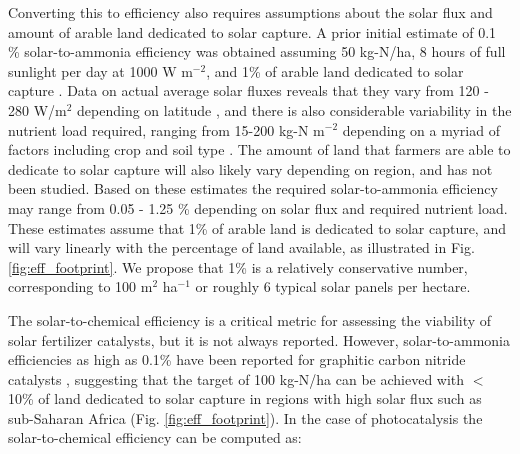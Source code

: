 Converting this to efficiency also requires assumptions about the solar flux and amount of arable land dedicated to solar capture. A prior initial estimate of 0.1 \% solar-to-ammonia efficiency was obtained assuming 50 kg-N/ha, 8 hours of full sunlight per day at 1000 W m$^{-2}$, and 1\% of arable land dedicated to solar capture \cite{Medford_2017}. Data on actual average solar fluxes reveals that they vary from 120 - 280 W/m$^2$ depending on latitude \cite{MacKay_2013}, and there is also considerable variability in the nutrient load required, ranging from 15-200 kg-N m$^{-2}$ depending on a myriad of factors including crop and soil type \cite{FAOSTAT}. The amount of land that farmers are able to dedicate to solar capture will also likely vary depending on region, and has not been studied. Based on these estimates the required solar-to-ammonia efficiency may range from 0.05 - 1.25 \% depending on solar flux and required nutrient load. These estimates assume that 1\% of arable land is dedicated to solar capture, and will vary linearly with the percentage of land available, as illustrated in Fig. \ref{fig:eff_footprint}. We propose that 1\% is a relatively conservative number, corresponding to 100 m$^2$ ha$^{-1}$ or roughly 6 typical solar panels per hectare.

The solar-to-chemical efficiency is a critical metric for assessing the viability of solar fertilizer catalysts, but it is not always reported. However, solar-to-ammonia efficiencies as high as 0.1\% have been reported for graphitic carbon nitride catalysts \cite{Shiraishi_2018}, suggesting that the target of 100 kg-N/ha can be achieved with $<$10\% of land dedicated to solar capture in regions with high solar flux such as sub-Saharan Africa (Fig. \ref{fig:eff_footprint}). In the case of photocatalysis the solar-to-chemical efficiency can be computed as:

